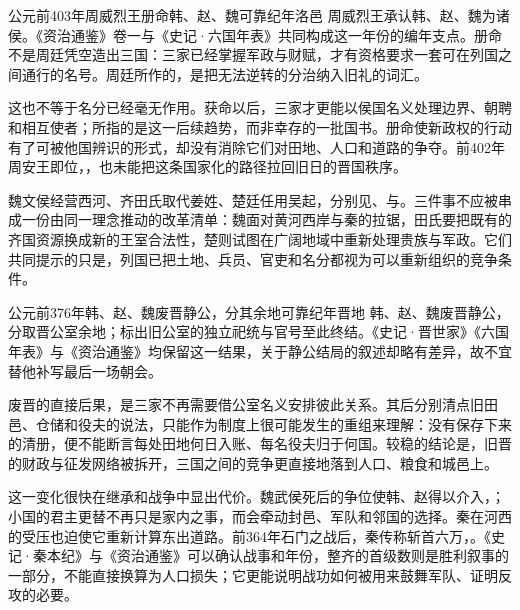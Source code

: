 \begin{event}{公元前403年}{周威烈王册命韩、赵、魏}{可靠纪年}{洛邑}
周威烈王承认韩、赵、魏为诸侯。《资治通鉴》卷一与《史记·六国年表》共同构成这一年份的编年支点。册命不是周廷凭空造出三国：三家已经掌握军政与财赋，才有资格要求一套可在列国之间通行的名号。周廷所作的，是把无法逆转的分治纳入旧礼的词汇。

这也不等于名分已经毫无作用。获命以后，三家才更能以侯国名义处理边界、朝聘和相互使者；所指的是这一后续趋势，而非幸存的一批国书。册命使新政权的行动有了可被他国辨识的形式，却没有消除它们对田地、人口和道路的争夺。前402年周安王即位，，也未能把这条国家化的路径拉回旧日的晋国秩序。
\end{event}

魏文侯经营西河、齐田氏取代姜姓、楚廷任用吴起，分别见、与。三件事不应被串成一份由同一理念推动的改革清单：魏面对黄河西岸与秦的拉锯，田氏要把既有的齐国资源换成新的王室合法性，楚则试图在广阔地域中重新处理贵族与军政。它们共同提示的只是，列国已把土地、兵员、官吏和名分都视为可以重新组织的竞争条件。

\begin{event}{公元前376年}{韩、赵、魏废晋静公，分其余地}{可靠纪年}{晋地}
韩、赵、魏废晋静公，分取晋公室余地；标出旧公室的独立祀统与官号至此终结。《史记·晋世家》《六国年表》与《资治通鉴》均保留这一结果，关于静公结局的叙述却略有差异，故不宜替他补写最后一场朝会。

废晋的直接后果，是三家不再需要借公室名义安排彼此关系。其后分别清点旧田邑、仓储和役夫的说法，只能作为制度上很可能发生的重组来理解：没有保存下来的清册，便不能断言每处田地何日入账、每名役夫归于何国。较稳的结论是，旧晋的财政与征发网络被拆开，三国之间的竞争更直接地落到人口、粮食和城邑上。
\end{event}

这一变化很快在继承和战争中显出代价。魏武侯死后的争位使韩、赵得以介入，；小国的君主更替不再只是家内之事，而会牵动封邑、军队和邻国的选择。秦在河西的受压也迫使它重新计算东出道路。前364年石门之战后，秦传称斩首六万，。《史记·秦本纪》与《资治通鉴》可以确认战事和年份，整齐的首级数则是胜利叙事的一部分，不能直接换算为人口损失；它更能说明战功如何被用来鼓舞军队、证明反攻的必要。

